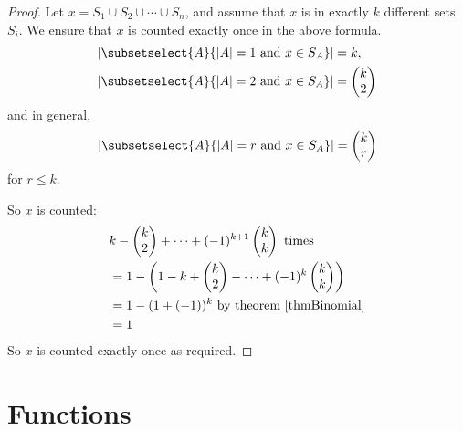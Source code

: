 \documentclass[../Main.tex]{subfiles}
\begin{document}
\begin{proof}
    Let $x = S_1 \cup S_2 \cup \cdots \cup S_n$, and assume that $x$ is in exactly $k$ different sets $S_i$. We ensure that $x$ is counted exactly once in the above formula.
    \begin{align*}
        &|\subsetselect{A}{|A| = 1 \text{ and } x \in S_A}| = k, \\
        &|\subsetselect{A}{|A| = 2 \text{ and } x \in S_A}| = \begin{pmatrix}k \\ 2\end{pmatrix}
    \end{align*}
    and in general,
    \begin{equation*}
        |\subsetselect{A}{|A| = r \text{ and } x \in S_A}| = \begin{pmatrix}k \\ r\end{pmatrix}
    \end{equation*}
    for $r \leq k$.\par
    So $x$ is counted:
    \begin{align*}
        & k - \begin{pmatrix}k \\ 2\end{pmatrix} + \cdots + (-1)^{k+1} \begin{pmatrix}k \\ k\end{pmatrix} \text{ times} \\
        &= 1 - \left(1 - k + \begin{pmatrix}k \\ 2\end{pmatrix} - \cdots + (-1)^k\begin{pmatrix}k \\ k\end{pmatrix}\right) \\
        &= 1-(1 + (-1))^k \text{ by theorem~\ref{thmBinomial}} \\
        &= 1
    \end{align*}
    So $x$ is counted exactly once as required.
\end{proof}
\section{Functions}
\end{document}
